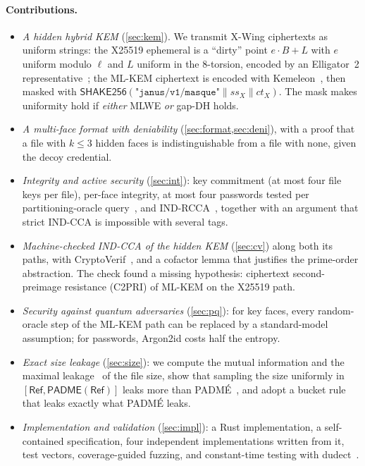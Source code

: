 \documentclass[11pt,a4paper]{article}
\theoremstyle{definition}
\theoremstyle{remark}
\newcommand{\RefSz}{\mathsf{Ref}}
\newcommand{\padme}{\mathsf{PADME}}
\newcommand{\SHAKE}{\mathsf{SHAKE256}}
\newcommand{\str}[1]{\texttt{"#1"}}
\begin{document}
\paragraph{Contributions.}
\begin{itemize}
\item \emph{A hidden hybrid KEM} (\cref{sec:kem}). We transmit X-Wing ciphertexts as uniform strings: the X25519 ephemeral is a ``dirty'' point $e\cdot B + L$ with $e$ uniform modulo $\ell$ and $L$ uniform in the 8-torsion, encoded by an Elligator~2 representative~\cite{elligator}; the ML-KEM ciphertext is encoded with Kemeleon~\cite{kemeleon}, then masked with $\SHAKE(\str{janus/v1/masque}\|ss_X\|ct_X)$. The mask makes uniformity hold if \emph{either} MLWE \emph{or} gap-DH holds.
\item \emph{A multi-face format with deniability} (\cref{sec:format,sec:deni}), with a proof that a file with $k\le 3$ hidden faces is indistinguishable from a file with none, given the decoy credential.
\item \emph{Integrity and active security} (\cref{sec:int}): key commitment (at most four file keys per file), per-face integrity, at most four passwords tested per partitioning-oracle query~\cite{partitioning}, and IND-RCCA~\cite{rcca}, together with an argument that strict IND-CCA is impossible with several tags.
\item \emph{Machine-checked IND-CCA of the hidden KEM} (\cref{sec:cv}) along both its paths, with CryptoVerif~\cite{cryptoverif}, and a cofactor lemma that justifies the prime-order abstraction. The check found a missing hypothesis: ciphertext second-preimage resistance (C2PRI) of ML-KEM on the X25519 path.
\item \emph{Security against quantum adversaries} (\cref{sec:pq}): for key faces, every random-oracle step of the ML-KEM path can be replaced by a standard-model assumption; for passwords, Argon2id costs half the entropy.
\item \emph{Exact size leakage} (\cref{sec:size}): we compute the mutual information and the maximal leakage~\cite{maxleak} of the file size, show that sampling the size uniformly in $[\RefSz,\padme(\RefSz)]$ leaks more than PADM\'E~\cite{purbs}, and adopt a bucket rule that leaks exactly what PADM\'E leaks.
\item \emph{Implementation and validation} (\cref{sec:impl}): a Rust implementation, a self-contained specification, four independent implementations written from it, test vectors, coverage-guided fuzzing, and constant-time testing with dudect~\cite{dudect}.
\end{itemize}
\end{document}
